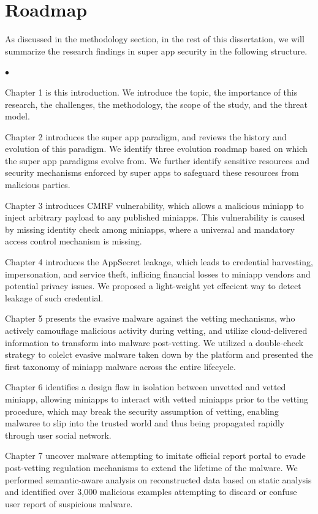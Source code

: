 \documentclass{osudissert96}
\renewenvironment{itemize}{
\begin{list}{$\bullet$}{
\setlength{\labelwidth}{8pt}
\setlength{\itemsep}{0pt}
\setlength{\leftmargin}{\labelwidth}
\addtolength{\leftmargin}{\labelsep}
\setlength{\parindent}{0pt}
\setlength{\listparindent}{\parindent}
\setlength{\parsep}{2pt}
\setlength{\topsep}{1pt}}}{\end{list}}
\begin{document}
\section{Roadmap}
As discussed in the methodology section, in the rest of this dissertation, we will summarize the research findings in super app security in the following structure.

\begin{itemize}
  \item Chapter 1 is this introduction. We introduce the topic, the importance of this research, the challenges, the methodology, the scope of the study, and the threat model.
  \item Chapter 2 introduces the super app paradigm, and reviews the history and evolution of this paradigm. We identify three evolution roadmap based on which the super app paradigms evolve from. We further identify sensitive resources and security mechanisms enforced by super apps to safeguard these resources from malicious parties.
  \item Chapter 3 introduces CMRF vulnerability, which allows a malicious miniapp to inject arbitrary payload to any published miniapps. This vulnerability is caused by missing identity check among miniapps, where a universal and mandatory access control mechanism is missing.
  \item Chapter 4 introduces the AppSecret leakage, which leads to credential harvesting, impersonation, and service theft, inflicing financial losses to miniapp vendors and potential privacy issues. We proposed a light-weight yet effecient way to detect leakage of such credential.
  \item Chapter 5 presents the evasive malware against the vetting mechanisms, who actively camouflage malicious activity during vetting, and utilize cloud-delivered information to transform into malware post-vetting. We utilized a double-check strategy to colelct evasive malware taken down by the platform and presented the first taxonomy of miniapp malware across the entire lifecycle.
  \item Chapter 6 identifies a design flaw in isolation between unvetted and vetted miniapp, allowing miniapps to interact with vetted miniapps prior to the vetting procedure, which may break the security assumption of vetting, enabling malwaree to slip into the trusted world and thus being propagated rapidly through user social network.
  \item Chapter 7 uncover malware attempting to imitate official report portal to evade post-vetting regulation mechanisms to extend the lifetime of the malware. We performed semantic-aware analysis on reconstructed data based on static analysis and identified over 3,000 malicious examples attempting to discard or confuse user report of suspicious malware.

\end{itemize}
\end{document}
